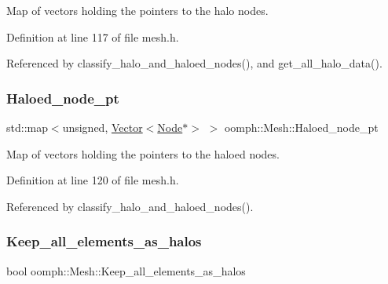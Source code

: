 Map of vectors holding the pointers to the halo nodes. 



Definition at line 117 of file mesh.\+h.



Referenced by classify\+\_\+halo\+\_\+and\+\_\+haloed\+\_\+nodes(), and get\+\_\+all\+\_\+halo\+\_\+data().

\mbox{\label{classoomph_1_1Mesh_ab05a3c50d404474a00996a0c9a0e1da8}} 
\subsubsection{\texorpdfstring{Haloed\+\_\+node\+\_\+pt}{Haloed\_node\_pt}}
{\footnotesize\ttfamily std\+::map$<$unsigned, \hyperlink{classoomph_1_1Vector}{Vector}$<$\hyperlink{classoomph_1_1Node}{Node}$\ast$$>$ $>$ oomph\+::\+Mesh\+::\+Haloed\+\_\+node\+\_\+pt\hspace{0.3cm}{\ttfamily [protected]}}



Map of vectors holding the pointers to the haloed nodes. 



Definition at line 120 of file mesh.\+h.



Referenced by classify\+\_\+halo\+\_\+and\+\_\+haloed\+\_\+nodes().

\mbox{\label{classoomph_1_1Mesh_a693e14069672a6770b31e9dfce191042}} 
\subsubsection{\texorpdfstring{Keep\+\_\+all\+\_\+elements\+\_\+as\+\_\+halos}{Keep\_all\_elements\_as\_halos}}
{\footnotesize\ttfamily bool oomph\+::\+Mesh\+::\+Keep\+\_\+all\+\_\+elements\+\_\+as\+\_\+halos\hspace{0.3cm}{\ttfamily [protected]}}



